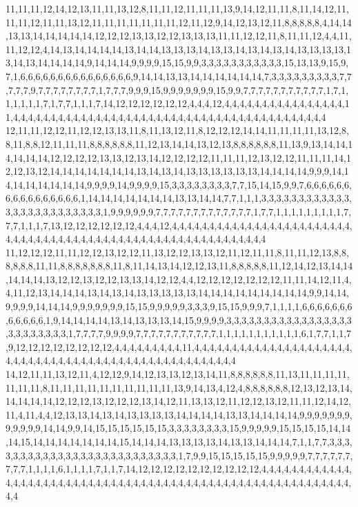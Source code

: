 11,11,11,12,14,12,13,11,11,13,12,8,11,11,12,11,11,11,13,9,14,12,11,11,8,11,14,12,11,11,11,12,11,11,13,12,11,11,11,11,11,11,11,12,11,12,9,14,12,13,12,11,8,8,8,8,8,4,14,14,13,13,14,14,14,14,14,12,12,12,13,13,12,12,13,13,13,11,11,12,12,11,8,11,11,12,4,4,11,11,12,12,4,14,13,14,14,14,14,13,14,14,13,13,13,14,13,13,14,13,14,13,14,13,13,13,13,13,14,13,14,14,14,14,9,14,14,14,9,9,9,9,15,15,9,9,3,3,3,3,3,3,3,3,3,3,3,15,13,13,9,15,9,7,1,6,6,6,6,6,6,6,6,6,6,6,6,6,6,6,9,14,14,13,13,14,14,14,14,14,14,7,3,3,3,3,3,3,3,3,3,7,7,7,7,7,9,7,7,7,7,7,7,7,7,1,7,7,7,9,9,9,15,9,9,9,9,9,9,9,15,9,9,7,7,7,7,7,7,7,7,7,7,7,1,7,1,1,1,1,1,1,7,1,7,7,1,1,1,7,14,12,12,12,12,12,12,4,4,4,12,4,4,4,4,4,4,4,4,4,4,4,4,4,4,4,4,11,4,4,4,4,4,4,4,4,4,4,4,4,4,4,4,4,4,4,4,4,4,4,4,4,4,4,4,4,4,4,4,4,4,4,4,4,4,4,4,4,4,4
12,11,11,12,12,11,12,12,13,13,11,8,11,13,12,11,8,12,12,12,14,14,11,11,11,11,13,12,8,8,11,8,8,12,11,11,11,8,8,8,8,8,8,11,12,13,14,14,13,12,13,8,8,8,8,8,8,11,13,9,13,14,14,14,14,14,14,12,12,12,12,13,13,12,13,14,12,12,12,12,11,11,11,12,13,12,12,11,11,11,14,12,12,13,12,14,14,14,14,14,14,14,13,14,13,14,13,13,13,13,13,13,14,14,14,14,9,9,9,14,14,14,14,14,14,14,14,9,9,9,9,14,9,9,9,9,15,3,3,3,3,3,3,3,3,7,7,15,14,15,9,9,7,6,6,6,6,6,6,6,6,6,6,6,6,6,6,6,6,1,14,14,14,14,14,14,14,13,13,14,14,7,7,1,1,1,3,3,3,3,3,3,3,3,3,3,3,3,3,3,3,3,3,3,3,3,3,3,3,3,3,1,9,9,9,9,9,9,7,7,7,7,7,7,7,7,7,7,7,7,7,1,7,7,1,1,1,1,1,1,1,1,1,7,7,7,1,1,1,7,13,12,12,12,12,12,12,4,4,4,12,4,4,4,4,4,4,4,4,4,4,4,4,4,4,4,4,4,4,4,4,4,4,4,4,4,4,4,4,4,4,4,4,4,4,4,4,4,4,4,4,4,4,4,4,4,4,4,4,4,4,4,4,4,4,4,4,4,4,4
11,12,12,12,11,11,12,12,13,12,12,11,13,12,12,13,13,12,11,12,11,11,8,11,11,12,13,8,8,8,8,8,8,11,11,8,8,8,8,8,8,8,11,8,11,14,13,14,12,12,13,11,8,8,8,8,8,11,12,14,12,13,14,14,14,14,14,13,12,12,13,12,12,13,13,14,12,12,4,4,12,12,12,12,12,12,12,11,11,14,12,11,4,4,11,12,13,14,14,14,13,14,13,14,13,13,13,13,13,14,14,14,14,14,14,14,14,14,9,9,14,14,9,9,9,9,14,14,14,9,9,9,9,9,9,9,15,15,9,9,9,9,9,3,3,3,9,15,15,9,9,9,7,1,1,1,1,6,6,6,6,6,6,6,6,6,6,6,6,1,9,14,14,14,14,13,14,13,13,13,14,15,9,9,9,9,3,3,3,3,3,3,3,3,3,3,3,3,3,3,3,3,3,3,3,3,3,3,3,3,3,1,7,7,7,7,9,9,9,9,7,7,7,7,7,7,7,7,7,7,7,1,1,1,1,1,1,1,1,1,1,1,6,1,7,7,1,1,7,9,12,12,12,12,12,12,12,12,4,4,4,4,4,4,4,4,4,11,4,4,4,4,4,4,4,4,4,4,4,4,4,4,4,4,4,4,4,4,4,4,4,4,4,4,4,4,4,4,4,4,4,4,4,4,4,4,4,4,4,4,4,4,4,4,4,4,4,4,4,4
14,12,11,11,13,12,11,4,12,12,9,14,12,13,13,12,13,14,11,8,8,8,8,8,8,11,13,11,11,11,11,11,11,11,8,11,11,11,11,11,11,11,11,11,11,13,9,14,13,4,12,4,8,8,8,8,8,8,12,13,12,13,14,14,14,14,14,12,12,12,13,12,12,12,13,14,12,11,13,13,12,11,12,12,13,12,11,11,12,14,12,11,4,11,4,4,12,13,13,14,13,14,13,13,13,13,14,14,14,14,13,13,14,14,14,14,9,9,9,9,9,9,9,9,9,9,9,9,14,14,9,9,14,15,15,15,15,15,15,3,3,3,3,3,3,3,3,15,9,9,9,9,9,15,15,15,15,14,14,14,15,14,14,14,14,14,14,14,15,14,14,14,13,13,13,13,14,13,13,14,14,14,7,1,1,7,7,3,3,3,3,3,3,3,3,3,3,3,3,3,3,3,3,3,3,3,3,3,3,3,3,3,3,1,7,9,9,15,15,15,15,15,9,9,9,9,9,7,7,7,7,7,7,7,7,7,1,1,1,1,6,1,1,1,1,7,1,1,7,14,12,12,12,12,12,12,12,12,12,12,4,4,4,4,4,4,4,4,4,4,4,4,4,4,4,4,4,4,4,4,4,4,4,4,4,4,4,4,4,4,4,4,4,4,4,4,4,4,4,4,4,4,4,4,4,4,4,4,4,4,4,4,4,4,4,4,4,4,4,4
